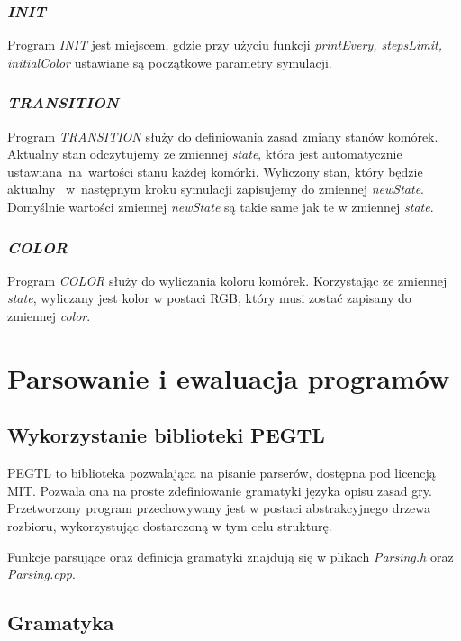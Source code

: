 \documentclass[declaration,shortabstract, inz]{iithesis}
\theoremstyle{definition} \newtheorem{definition}{Definicja}[]
\theoremstyle{plain} \newtheorem{remark}[definition]{Obserwacja}
\theoremstyle{plain} \newtheorem{theorem}[definition]{Twierdzenie}
\theoremstyle{plain} \newtheorem{example}{Przykład}[definition]
\theoremstyle{plain} \newtheorem{lemma}[definition]{Lemat}
\begin{document}
\subsection{\textit{INIT}}
Program \textit{INIT} jest miejscem, gdzie przy użyciu funkcji \textit{printEvery, stepsLimit, initialColor} ustawiane są początkowe parametry symulacji.

\subsection{\textit{TRANSITION}}
Program \textit{TRANSITION} służy do definiowania zasad zmiany stanów komórek. Aktualny stan odczytujemy ze zmiennej \textit{state}, która jest automatycznie ustawiana~na~wartości stanu każdej komórki. Wyliczony stan, który będzie aktualny ~w~następnym kroku symulacji zapisujemy do zmiennej \textit{newState}. Domyślnie wartości zmiennej \textit{newState} są takie same jak te w zmiennej \textit{state}.

\subsection{\textit{COLOR}}
Program \textit{COLOR} służy do wyliczania koloru komórek. Korzystając ze zmiennej \textit{state}, wyliczany jest kolor w postaci RGB, który musi zostać zapisany do zmiennej \textit{color}. 

\chapter{Parsowanie i ewaluacja programów}

\section{Wykorzystanie biblioteki PEGTL}
PEGTL to biblioteka pozwalająca na pisanie parserów, dostępna pod licencją MIT. Pozwala ona na proste zdefiniowanie gramatyki języka opisu zasad gry. Przetworzony program przechowywany jest w postaci abstrakcyjnego drzewa rozbioru, wykorzystując dostarczoną w tym celu strukturę. 

Funkcje parsujące oraz definicja gramatyki znajdują się w plikach \textit{Parsing.h} oraz \textit{Parsing.cpp}. 

\section{Gramatyka}
\end{document}
